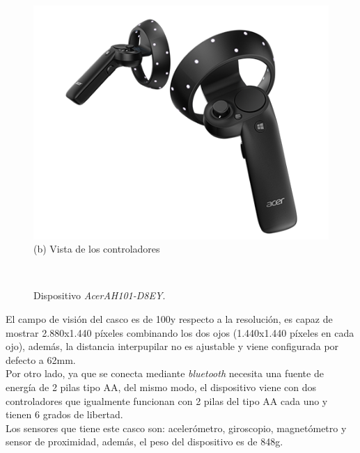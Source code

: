 \begin{figure}[H]
\begin{minipage}[t]{0.5\textwidth}
        \includegraphics[scale=0.42]{Images/Estado del arte/acerh101controller.png}\\
       (b) Vista de los controladores
    \end{minipage}\\
    \caption[Dispositivo \textit{AcerAH101-D8EY}]{Dispositivo \textit{AcerAH101-D8EY}\footnotemark.}
    \label{fig:acerAH101}
\end{figure}


El campo de visión del casco es de 100\degree  y respecto a la resolución, es capaz de mostrar 2.880x1.440 píxeles combinando los dos ojos (1.440x1.440 píxeles en cada ojo), además, la distancia interpupilar no es ajustable y viene configurada por defecto a 62mm.\\



Por otro lado, ya que se conecta mediante \textit{bluetooth} necesita una fuente de energía de 2 pilas tipo AA, del mismo modo, el dispositivo viene con dos controladores que igualmente funcionan con 2 pilas del tipo AA cada uno y tienen 6 grados de libertad. \\

Los sensores que tiene este casco son: acelerómetro, giroscopio, magnetómetro y sensor de proximidad, además, el peso del dispositivo es de 848g. 